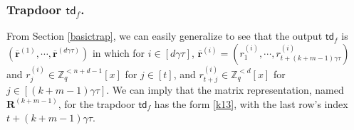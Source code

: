 \documentclass[runningheads]{llncs}
\begin{document}
\subsubsection{Trapdoor  $\mathsf{td}_f$.} From Section \ref{basictrap}, we can easily generalize to see that the output   $\textsf{td}_f$ is $(\overline{\mathbf{r}}^{(1)}, \cdots, \overline{\mathbf{r}}^{(d \gamma \tau)})$ in which for $i \in [d\gamma \tau]$, $\overline{\mathbf{r}}^{(i)}=(r^{(i)}_1, \cdots,r^{(i)}_{t+(k+m-1) \gamma \tau} )$ and $r^{(i)}_j \in  \mathbb{Z}_q^{<n+d-1}[x] $ for $j \in [t]$, and $r^{(i)}_{t+j} \in  \mathbb{Z}_q^{<d}[x] $ for $j \in [(k+m-1)\gamma\tau]$. We can imply that the matrix representation, named $\mathbf{R}^{(k+m-1)}$, for  the trapdoor $\mathsf{td}_f$ has the form  \eqref{k13}, with the last row's index ${t+(k+m-1) \gamma\tau}$.

\iffalse


 \begin{equation}\label{k29}
 \mathbf{R}^{(k+m-1)}=\begin{bmatrix}
 \mathsf{Tp}^{2d-1,1}(r^{(1)}_{1})& \cdots& \mathsf{Tp}^{2d-1,1}(r^{(d\gamma \tau)}_{1})\\
 \vdots&&\vdots\\
 \mathsf{Tp}^{2d-1,1}(r^{(1)}_{t}) & \cdots& \mathsf{Tp}^{2d-1,1}(r^{(d\gamma \tau)}_{t})\\
 \mathsf{Tp}^{d,1}(r^{(1)}_{t+1})& \cdots& \mathsf{Tp}^{d,1}(r^{(d\gamma \tau)}_{t+1})\\
 \vdots&&\vdots\\
 \mathsf{Tp}^{d,1}(r^{(1)}_{t'})& \cdots& \mathsf{Tp}^{d,1}(r^{(d\gamma \tau)}_{t'})\\ 
  \vdots&&\vdots\\
  \mathsf{Tp}^{d,1}(r^{(1)}_{t+(k+m-1) \gamma\tau})& \cdots& \mathsf{Tp}^{d,1}(r^{(d\gamma \tau)}_{t+(k+m-1) \gamma\tau})\\ 
 \end{bmatrix}.
 \end{equation}
 
 \fi 
 
 
\end{document}
